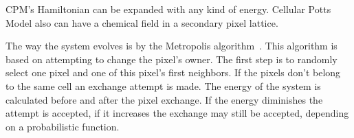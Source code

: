 CPM's Hamiltonian can be expanded with any kind 
of energy. Cellular Potts Model also can have a chemical field in a secondary 
pixel lattice.

The way the system evolves is by the Metropolis 
algorithm~\cite{hid-sp18-601-paper-metropolis1953equation}. This algorithm 
is based on attempting to change the pixel's owner.
 The first step is to randomly select one 
pixel and one of this pixel's first neighbors. If the pixels don't belong to 
the same cell an exchange attempt is made. The energy of the system is 
calculated before and after the pixel exchange. If the energy diminishes
the attempt is accepted, if it increases the exchange may still be accepted,
 depending on a probabilistic function.

\subsection{}\label{}




 

